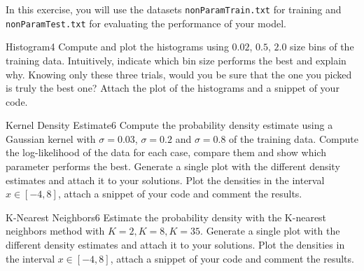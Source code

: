 \newif\ifvimbug
\vimbugfalse

\ifvimbug

\fi

 
In this exercise, you will use the datasets \texttt{nonParamTrain.txt} for training and \texttt{nonParamTest.txt} for evaluating the performance of your model.

\begin{questions}


\begin{question}{Histogram}{4}
Compute and plot the histograms using $0.02$, $0.5$, $2.0$ size bins of the training data.  
Intuitively, indicate which bin size performs the best and explain why. Knowing only these three trials, would you be sure that the one you picked is truly the best one? Attach the plot of the histograms and a snippet of your code.

\begin{answer}\end{answer}

\end{question}


\begin{question}{Kernel Density Estimate}{6}
Compute the probability density estimate using a Gaussian kernel with $\sigma=0.03$, $\sigma=0.2$ and $\sigma=0.8$ of the training data. Compute the log-likelihood of the data for each case, compare them and show which parameter performs the best.
Generate a single plot with the different density estimates and attach it to your solutions. Plot the densities in the interval $x \in [-4,8]$, attach a snippet of your code and comment the results.

\begin{answer}\end{answer}

\end{question}


\begin{question}{K-Nearest Neighbors}{6}
Estimate the probability density with the K-nearest neighbors method with $K=2, K=8, K=35$.
Generate a single plot with the different density estimates and attach it to your solutions. Plot the densities in the interval $x \in [-4,8]$, attach a snippet of your code and comment the results.


\end{question}
\end{questions}
